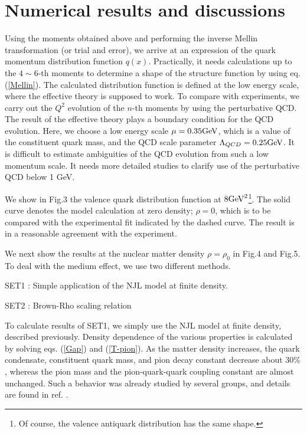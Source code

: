 \section{Numerical results and discussions}
\bs
Using the moments obtained above and performing the inverse Mellin
transformation (or trial and error),
we arrive at an expression of the quark momentum
distribution function $q(x)$.   Practically, it needs calculations
up to the
$4 \sim 6$-th moments to determine a shape of the structure
function by using eq. (\ref{Mellin}).
The calculated distribution function is defined at the low
energy scale, where the effective theory is supposed to work.
To compare with experiments, we
carry out the $Q^2$ evolution of the $n$-th moments by using the
perturbative QCD\cite{Muta}.
The result of the effective theory plays a boundary condition for
the QCD evolution.   Here, we choose a low energy scale
$\mu = 0.35 \mbox{GeV}$,
which is a value of the constituent quark mass,
and the QCD scale parameter $\Lambda_{QCD} = 0.25 \mbox{GeV}$.
It is difficult to estimate ambiguities of
the QCD evolution from such a low momentum scale.   It needs more
detailed studies to clarify use of the perturbative QCD below 1 GeV.


We show in Fig.3 the valence quark distribution function at $8
\mbox{GeV}^2$\footnote{Of course, the valence antiquark distribution
has the same shape.}.  The
solid curve denotes the model calculation at zero density;
$\rho = 0$, which is to be compared with the
experimental fit indicated by the dashed curve\cite{SMRS}.
The result is in a reasonable agreement with the experiment.

We next show the results at the nuclear matter density
$\rho = \rho_0 $ in Fig.4 and Fig.5.
To deal with the medium effect, we use two different methods.

\vglue 0.4cm
SET1 : Simple application of the NJL model at finite density.

\in
SET2 : Brown-Rho scaling relation

\vglue 0.4cm
To calculate results of SET1, we simply use the NJL model at finite
density, described previously.
Density dependence of the various properties is calculated
by solving eqs.
(\ref{Gap}) and (\ref{T-pion}).  As the matter density increases,
the quark condensate, constituent quark
mass, and pion decay constant decrease about $30\%$,
whereas the pion mass and the
pion-quark-quark coupling constant are almost unchanged.
Such a behavior was already studied by several groups, and
details are found in ref. \cite{Kle}.


